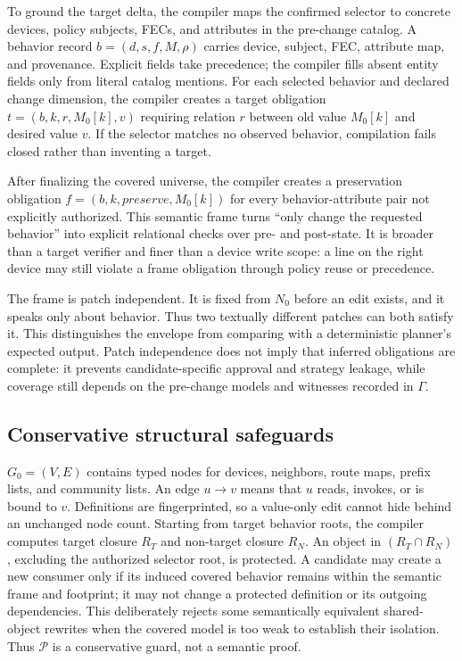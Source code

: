 \documentclass[conference]{IEEEtran}
\newcommand{\deps}{\mathcal{P}}
\begin{document}
To ground the target delta, the compiler maps the confirmed selector to concrete devices, policy subjects,
FECs, and attributes in the pre-change catalog.  A behavior record
$b=(d,s,f,M,\rho)$ carries device, subject, FEC, attribute map, and provenance.
Explicit fields take precedence; the compiler fills absent entity fields only
from literal catalog mentions.  For each selected behavior and declared change
dimension, the compiler creates a target obligation
$t=(b,k,r,M_0[k],v)$ requiring relation $r$ between old value $M_0[k]$ and
desired value $v$.  If the selector matches no observed behavior, compilation
fails closed rather than inventing a target.

After finalizing the covered universe, the compiler creates a preservation
obligation $f=(b,k,\textit{preserve},M_0[k])$ for every behavior-attribute pair
not explicitly authorized.  This semantic
frame turns ``only change the requested behavior'' into explicit relational
checks over pre- and post-state.  It is broader than a target verifier and finer
than a device write scope: a line on the right device may still violate a frame
obligation through policy reuse or precedence.

The frame is patch independent.  It is fixed from $N_0$ before an edit exists,
and it speaks only about behavior.  Thus two textually different patches can
both satisfy it.  This distinguishes the envelope from comparing with a
deterministic planner's expected output.  Patch independence does not imply
that inferred obligations are complete: it prevents candidate-specific
approval and strategy leakage, while coverage still depends on the pre-change
models and witnesses recorded in $\Gamma$.

\subsection{Conservative structural safeguards}

$G_0=(V,E)$ contains typed nodes for devices, neighbors, route maps, prefix
lists, and community lists.  An edge $u\rightarrow v$ means that $u$ reads,
invokes, or is bound to $v$.  Definitions are fingerprinted, so a value-only
edit cannot hide behind an unchanged node count.  Starting from target behavior
roots, the compiler computes target closure $R_T$ and non-target closure $R_N$.
An object in $(R_T\cap R_N)$, excluding the authorized selector root, is
protected.  A candidate may create a new consumer only if its induced covered
behavior remains within the semantic frame and footprint; it may not change a
protected definition or its outgoing dependencies.  This deliberately rejects
some semantically equivalent shared-object rewrites when the covered model is
too weak to establish their isolation.  Thus $\deps$ is a conservative guard,
not a semantic proof.
\end{document}

